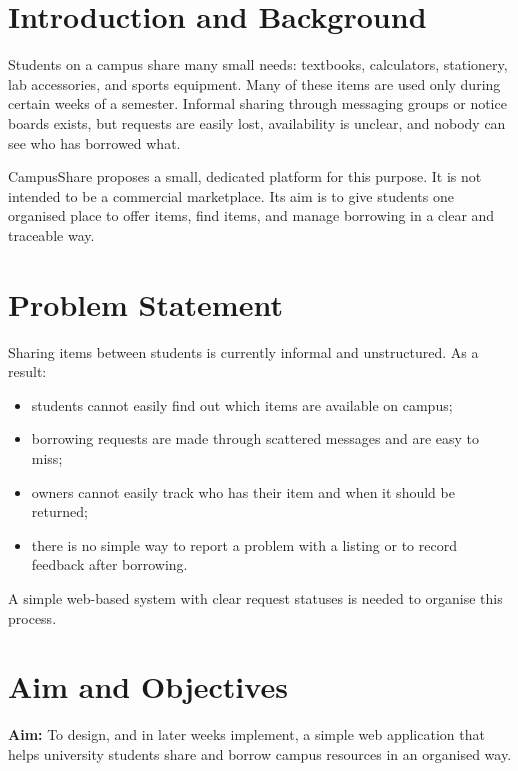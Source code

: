 \documentclass[11pt,a4paper]{article}
\begin{document}
\section{Introduction and Background}
Students on a campus share many small needs: textbooks, calculators, stationery, lab accessories, and sports equipment. Many of these items are used only during certain weeks of a semester. Informal sharing through messaging groups or notice boards exists, but requests are easily lost, availability is unclear, and nobody can see who has borrowed what.

CampusShare proposes a small, dedicated platform for this purpose. It is not intended to be a commercial marketplace. Its aim is to give students one organised place to offer items, find items, and manage borrowing in a clear and traceable way.

\section{Problem Statement}
Sharing items between students is currently informal and unstructured. As a result:
\begin{itemize}
  \item students cannot easily find out which items are available on campus;
  \item borrowing requests are made through scattered messages and are easy to miss;
  \item owners cannot easily track who has their item and when it should be returned;
  \item there is no simple way to report a problem with a listing or to record feedback after borrowing.
\end{itemize}
A simple web-based system with clear request statuses is needed to organise this process.

\section{Aim and Objectives}
\textbf{Aim:} To design, and in later weeks implement, a simple web application that helps university students share and borrow campus resources in an organised way.
\end{document}
